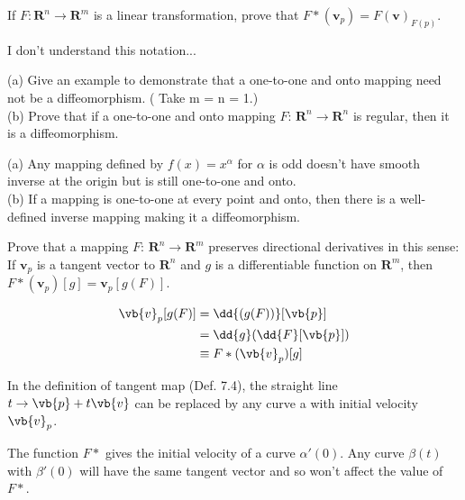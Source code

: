 \begin{problem}{5}
  If \(F: \mathbf{R}^n \rightarrow \mathbf{R}^m\) is a linear transformation, prove that \(F*(\mathbf{v}_p) = F(\mathbf{v})_{F(p)}\).
\end{problem}
\begin{sol}
  I don't understand this notation...
\end{sol}

\begin{problem}{6}
  (a) Give an example to demonstrate that a one-to-one and onto mapping need not be a diffeomorphism. ( Take m = n = 1.)\\
  (b) Prove that if a one-to-one and onto mapping \(F\): \(\mathbf{R}^n \rightarrow \mathbf{R}^n\) is regular, then it is a diffeomorphism.
\end{problem}
\begin{sol}
  (a) Any mapping defined by \(f(x)=x^\alpha\) for \(\alpha\) is odd doesn't have smooth inverse at the origin but is still one-to-one and onto.\\
  (b) If a mapping is one-to-one at every point and onto, then there is a well-defined inverse mapping making it a diffeomorphism.
\end{sol}

\begin{problem}{7}
  Prove that a mapping \(F:\, \mathbf{R}^n \rightarrow \mathbf{R}^m\) preserves directional derivatives in this sense: If \(\mathbf{v}_p\) is a tangent vector to \(\mathbf{R}^n\) and \(g\) is a differentiable function on \(\mathbf{R}^m\), then \(F*(\mathbf{v}_p)[g] = \mathbf{v}_p[g(F)]\).
\end{problem}
\begin{sol}
  \begin{align}
    \vb{v}_p[g(F)]&=\dd{(g(F))}[\vb{p}]\\
    &=\dd{g}(\dd{F}[\vb{p}])\\
    &\equiv F*(\vb{v}_p)[g]
  \end{align}
\end{sol}

\begin{problem}{8}
  In the definition of tangent map (Def. 7.4), the straight line \(t \rightarrow \vb{p} + t\vb{v}\) can be replaced by any curve a with initial velocity \(\vb{v}_p\).
\end{problem}
\begin{sol}
  The function \(F*\) gives the initial velocity of a curve \(\alpha '(0)\). Any curve \(\beta(t)\) with \(\beta ' (0)\) will have the same tangent vector and so won't affect the value of \(F*\).
\end{sol}

